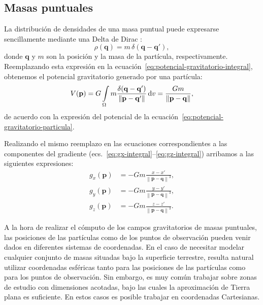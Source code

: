 \subsection{Masas puntuales}

La distribución de densidades de una masa puntual puede expresarse
sencillamente mediante una Delta de Dirac \citep{vladimirov1979}:
%
\begin{equation}
    \rho(\mathbf{q}) = m \, \delta(\mathbf{q} - \mathbf{q'}),
\end{equation}
%
donde $\mathbf{q}$ y $m$ son la posición y la masa de la partícula,
respectivamente.
Reemplazando esta expresión en la
ecuación~\ref{eq:potencial-gravitatorio-integral}, obtenemos el potencial
gravitatorio generado por una partícula:
%
\begin{equation}
    V(\mathbf{p}) =
        G \int\limits_\Omega
        m \frac{\delta(\mathbf{q} - \mathbf{q'})}{\left\lVert \mathbf{p}
            - \mathbf{q'} \right\rVert}
        \mathop{}\!\textnormal{d} v =
        \frac{G m}{\left\lVert \mathbf{p} - \mathbf{q} \right\rVert},
    \label{eq:potencial-masa-puntual}
\end{equation}
%
de acuerdo con la expresión del potencial de la
ecuación~\ref{eq:potencial-gravitatorio-particula}.

Realizando el mismo reemplazo en las ecuaciones correspondientes a las
componentes del gradiente (ecs.~\ref{eq:gx-integral}--\ref{eq:gz-integral})
arribamos a las siguientes expresiones:
%
\begin{align}
    g_x(\mathbf{p}) &=
        - G m
        \frac{x - x'}{\left\lVert \mathbf{p} - \mathbf{q} \right\rVert^3},
    \label{eq:gx-particula}
    \\
    g_y(\mathbf{p}) &=
        - G m
        \frac{y - y'}{\left\lVert \mathbf{p} - \mathbf{q} \right\rVert^3},
    \label{eq:gy-particula}
    \\
    g_z(\mathbf{p}) &=
        - G m
        \frac{z - z'}{\left\lVert \mathbf{p} - \mathbf{q} \right\rVert^3}.
    \label{eq:gz-particula}
\end{align}

A la hora de realizar el cómputo de los campos gravitatorios de masas
puntuales, las posiciones de las partículas como de los puntos de observación
pueden venir dados en diferentes sistemas de coordenadas.
En el caso de necesitar modelar cualquier conjunto de masas situadas bajo la
superficie terrestre, resulta natural utilizar coordenadas esféricas tanto para
las posiciones de las partículas como para los puntos de observación.
Sin embargo, es muy común trabajar sobre zonas de estudio con dimensiones
acotadas, bajo las cuales la aproximación de Tierra plana es suficiente. En
estos casos es posible trabajar en coordenadas Cartesianas.

